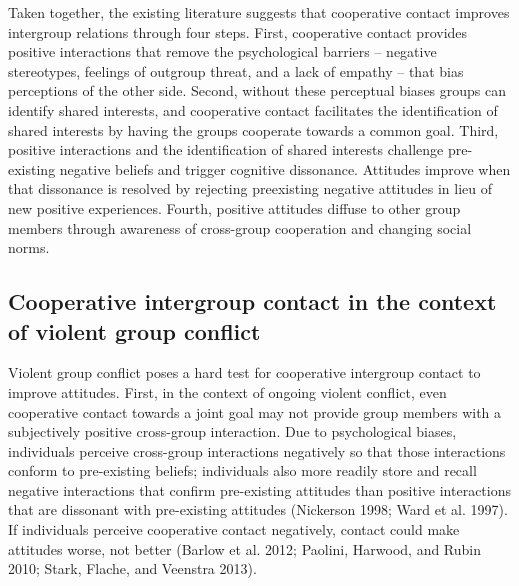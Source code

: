 \documentclass[11pt]{article}
\begin{document}
Taken together, the existing literature suggests that cooperative
contact improves intergroup relations through four steps. First,
cooperative contact provides positive interactions that remove the
psychological barriers -- negative stereotypes, feelings of outgroup
threat, and a lack of empathy -- that bias perceptions of the other
side. Second, without these perceptual biases groups can identify shared
interests, and cooperative contact facilitates the identification of
shared interests by having the groups cooperate towards a common goal.
Third, positive interactions and the identification of shared interests
challenge pre-existing negative beliefs and trigger cognitive
dissonance. Attitudes improve when that dissonance is resolved by
rejecting preexisting negative attitudes in lieu of new positive
experiences. Fourth, positive attitudes diffuse to other group members
through awareness of cross-group cooperation and changing social norms.

\hypertarget{cooperative-intergroup-contact-in-the-context-of-violent-group-conflict}{%
\subsection{Cooperative intergroup contact in the context of violent
group
conflict}\label{cooperative-intergroup-contact-in-the-context-of-violent-group-conflict}}

Violent group conflict poses a hard test for cooperative intergroup
contact to improve attitudes. First, in the context of ongoing violent
conflict, even cooperative contact towards a joint goal may not provide
group members with a subjectively positive cross-group interaction. Due
to psychological biases, individuals perceive cross-group interactions
negatively so that those interactions conform to pre-existing beliefs;
individuals also more readily store and recall negative interactions
that confirm pre-existing attitudes than positive interactions that are
dissonant with pre-existing attitudes (Nickerson 1998; Ward et al.
1997). If individuals perceive cooperative contact negatively, contact
could make attitudes worse, not better (Barlow et al. 2012; Paolini,
Harwood, and Rubin 2010; Stark, Flache, and Veenstra 2013).
\end{document}
